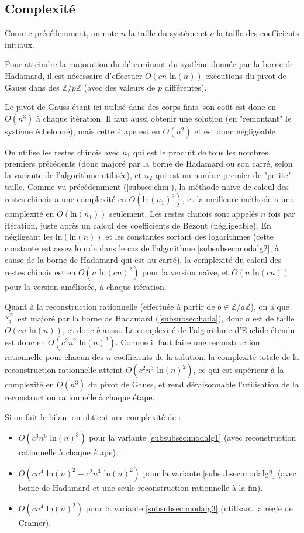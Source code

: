 \documentclass[french]{article}
\begin{document}
\subsection{Complexité} \label{subsec:modcomplx}
Comme précédemment, on note $n$ la taille du système et $c$ la taille des coefficients initiaux.
\par
Pour atteindre la majoration du déterminant du système donnée par la borne de Hadamard, il est nécessaire d'effectuer $O(cn \mbox{ ln}(n))$ exécutions du pivot de Gauss dans des $\mathbb{Z}/p\mathbb{Z}$ (avec des valeurs de $p$ différentes).
\par
Le pivot de Gauss étant ici utilisé dans des corps finis, son coût est donc en $O(n^3)$ à chaque itération. Il faut aussi obtenir une solution (en "remontant" le système échelonné), mais cette étape est en $O(n^2)$ et est donc négligeable.
\par
On utilise les restes chinois avec $n_1$ qui est le produit de tous les nombres premiers précédents (donc majoré par la borne de Hadamard ou son carré, selon la variante de l'algorithme utilisée), et $n_2$ qui est un nombre premier de "petite" taille.
Comme vu précédemment (\ref{subsec:chin}), la méthode naïve de calcul des restes chinois a une complexité en $O(\mbox{ln}(n_1)^2)$, et la meilleure méthode a une complexité en $O(\mbox{ln}(n_1))$ seulement. Les restes chinois sont appelés $n$ fois par itération, juste après un calcul des coefficients de Bézout (négligeable).
En négligeant les $\mbox{ln}(\mbox{ln}(n))$ et les constantes sortant des logarithmes (cette constante est assez lourde dans le cas de l'algorithme \ref{subsubsec:modalg2}, à cause de la borne de Hadamard qui est au carré), la complexité du calcul des restes chinois est en $O(n \mbox{ ln}(cn)^2)$ pour la version naïve, et $O(n \mbox{ ln}(cn))$ pour la version améliorée, à chaque itération.
\par
Quant à la reconstruction rationnelle (effectuée à partir de $b \in \mathbb{Z}/a\mathbb{Z}$), on a que $\frac{\sqrt{a}}{2}$ est majoré par la borne de Hadamard (\ref{subsubsec:hada}), donc $a$ est de taille $O(cn\mbox{ ln}(n))$, et donc $b$ aussi. La complexité de l'algorithme d'Euclide étendu est donc en $O(c^2n^2\mbox{ ln}(n)^2)$. Comme il faut faire une reconstruction rationnelle pour chacun des $n$ coefficients de la solution, la complexité totale de la reconstruction rationnelle atteint $O(c^2n^3\mbox{ ln}(n)^2)$, ce qui est supérieur à la complexité en $O(n^3)$ du pivot de Gauss, et rend déraisonnable l'utilisation de la reconstruction rationnelle à chaque étape.
\par
Si on fait le bilan, on obtient une complexité de :
\begin{itemize}
	\item $O(c^3n^6\mbox{ ln}(n)^3)$ pour la variante \ref{subsubsec:modalg1} (avec reconstruction rationnelle à chaque étape).
	\item $O(cn^4\mbox{ ln}(n)^2 + c^2n^3\mbox{ ln}(n)^2)$ pour la variante \ref{subsubsec:modalg2} (avec borne de Hadamard et une seule reconstruction rationnelle à la fin).
	\item $O(cn^4\mbox{ ln}(n)^2)$ pour la variante \ref{subsubsec:modalg3} (utilisant la règle de Cramer).
\end{itemize}
\end{document}
